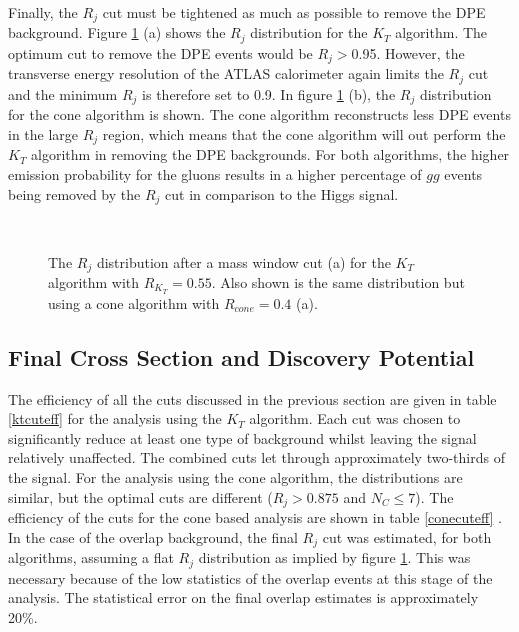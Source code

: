 Finally, the $R_j$ cut must be tightened as much as possible to remove the DPE background. Figure \ref{rjlast} (a) shows the $R_j$ distribution for the $K_T$ algorithm. The optimum cut to remove 
the DPE events would be $R_j>$0.95. However, the transverse energy resolution of the ATLAS calorimeter again limits the $R_j$ cut and the minimum $R_j$ is therefore set to 0.9. In figure \ref{rjlast} (b), the $R_j$ distribution for the cone algorithm is shown. The cone algorithm reconstructs less DPE events in the large $R_j$ region, which means that the cone algorithm will out perform the $K_T$ algorithm in removing the DPE backgrounds. For both algorithms, the higher emission probability for the gluons results in a higher percentage of $gg$ events being removed by the $R_j$ cut in comparison to the Higgs signal. 

\begin{figure}
\centering
\mbox{
	\quad
	}
\caption[The $R_j$ distributions after a mass window cut ]{The $R_j$ distribution after a mass window cut (a) for the $K_T$ algorithm with $R_{K_T}=0.55$. Also shown is the same distribution but using a cone algorithm with $R_{cone}=0.4$ (a). \label{rjlast}}
\end{figure}

\subsection{Final Cross Section and Discovery Potential}\label{finalresults}

The efficiency of all the cuts discussed in the previous section are given in table \ref{ktcuteff} for the analysis using the  $K_T$ algorithm. Each cut was chosen to significantly reduce at least one type of background whilst leaving the signal relatively unaffected. The combined cuts let through approximately two-thirds of the signal. For the analysis using the cone algorithm, the distributions are similar, but the optimal cuts are different ($R_j > 0.875$ and $N_C \leq 7$). The efficiency of the cuts for the cone based analysis are shown in table \ref{conecuteff} . In the case of the overlap background, the final $R_{j}$ cut was estimated, for both algorithms, assuming a flat $R_j$ distribution as implied by figure \ref{rjlast}. This was necessary because of the low statistics of the overlap events at this stage of the analysis. The statistical error on the final overlap estimates is approximately 20\%.

